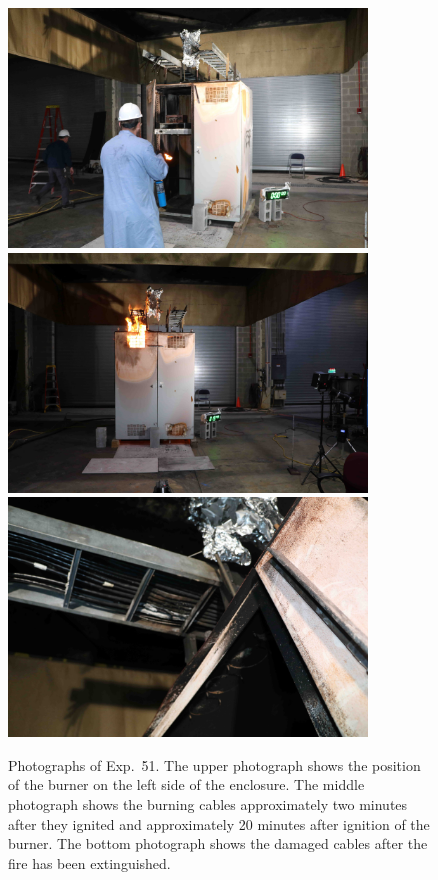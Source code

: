 \begin{figure}[p]
\centering
\includegraphics[height=2.50in]{../FIGURES/Test_51_setup} \\ \vspace{0.1in}
\includegraphics[height=2.50in]{../FIGURES/Test_51_ignition} \\ \vspace{0.1in}
\includegraphics[height=2.50in]{../FIGURES/Test_51_scar}
\caption[Photographs of Exp.~51]{Photographs of Exp.~51. The upper photograph shows the position of the burner on the left side of the enclosure. The middle photograph shows the burning cables approximately two minutes after they ignited and approximately 20 minutes after ignition of the burner. The bottom photograph shows the damaged cables after the fire has been extinguished.}
\label{fig:Test_51_photos}
\end{figure}


